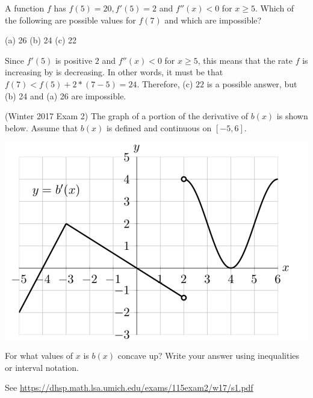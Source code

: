 \documentclass[11pt]{exam}
\begin{document}
\begin{questions}
\begin{solution}
  \end{solution}
\question A function \(f\) has \(f(5) = 20, f'(5)=2\) and \(f''(x) <
  0\) for \(x \geq 5\). Which of the following are possible values for
  \(f(7)\) and which are impossible?
  \begin{center}
    (a) 26 \hspace{1.5in} (b) 24 \hspace{1.5in} (c) 22
  \end{center}
  \begin{solution}
    Since \(f'(5)\) is positive \(2\) and \(f''(x) < 0\) for \(x \geq
    5\), this means that the rate \(f\) is increasing by is
    decreasing. In other words, it must be that \(f(7) <
    f(5)+2*(7-5) = 24\). Therefore, (c) \(22\) is a possible answer,
    but (b) 24 and (a) 26 are impossible.
  \end{solution}
\question (Winter 2017 Exam 2) The graph of a portion of the derivative of $b(x)$ is shown below. Assume that $b(x)$ is defined and continuous on $[-5,6]$.
  \begin{center}
\includegraphics[scale=0.7]{graphb.png}
  \end{center}
For what values of $x$ is $b(x)$ concave up? Write your answer using inequalities or interval notation.
  \begin{solution}
    See \href{https://dhsp.math.lsa.umich.edu/exams/115exam2/w17/s1.pdf}{https://dhsp.math.lsa.umich.edu/exams/115exam2/w17/s1.pdf}
  \end{solution}


\end{questions}
\end{document}
